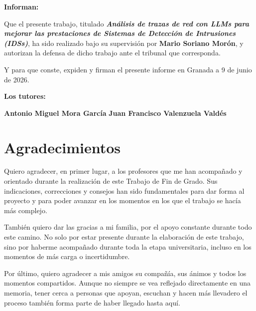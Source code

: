 \textbf{Informan:}

\vspace{0.5cm}

Que el presente trabajo, titulado \textit{\textbf{Análisis de trazas de red con LLMs para mejorar las prestaciones de Sistemas de Detección de Intrusiones (IDSs)}},
ha sido realizado bajo su supervisión por \textbf{Mario Soriano Morón}, y autorizan la defensa de dicho trabajo ante el tribunal
que corresponda.

\vspace{0.5cm}

Y para que conste, expiden y firman el presente informe en Granada a 9 de junio de 2026.

\vspace{1cm}

\textbf{Los tutores:}

\vspace{5cm}

\noindent \textbf{Antonio Miguel Mora García} \hfill \textbf{Juan Francisco Valenzuela Valdés}

\chapter*{Agradecimientos}
\thispagestyle{empty}

       \vspace{1cm}


Quiero agradecer, en primer lugar, a los profesores que me han acompañado y orientado durante la realización de este Trabajo de Fin de Grado. Sus indicaciones, correcciones y consejos han sido fundamentales para dar forma al proyecto y para poder avanzar en los momentos en los que el trabajo se hacía más complejo.

También quiero dar las gracias a mi familia, por el apoyo constante durante todo este camino. No solo por estar presente durante la elaboración de este trabajo, sino por haberme acompañado durante toda la etapa universitaria, incluso en los momentos de más carga o incertidumbre.

Por último, quiero agradecer a mis amigos su compañía, sus ánimos y todos los momentos compartidos. Aunque no siempre se vea reflejado directamente en una memoria, tener cerca a personas que apoyan, escuchan y hacen más llevadero el proceso también forma parte de haber llegado hasta aquí.

